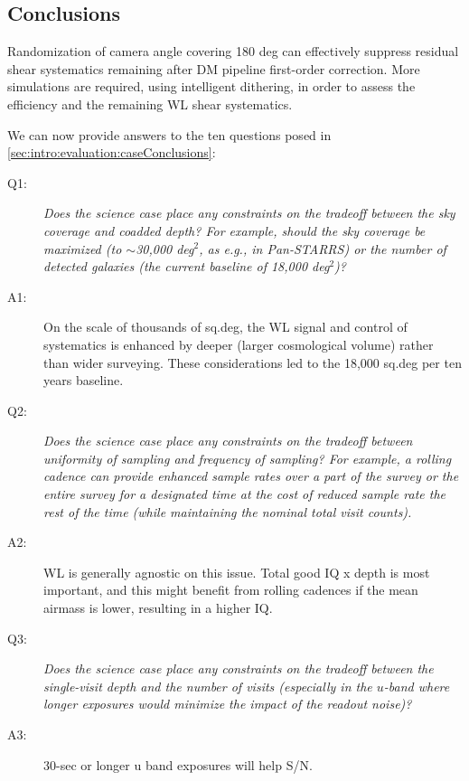 \subsection{Conclusions}

Randomization of camera angle covering 180 deg can effectively suppress
residual shear systematics remaining after DM pipeline first-order
correction.   More simulations are required, using intelligent
dithering, in order to assess the efficiency and the remaining WL shear
systematics.


We can now provide answers to the ten questions posed in %
\autoref{sec:intro:evaluation:caseConclusions}:

\begin{description}

\item[Q1:] {\it Does the science case place any constraints on the
tradeoff between the sky coverage and coadded depth? For example, should
the sky coverage be maximized (to $\sim$30,000 deg$^2$, as e.g., in
Pan-STARRS) or the number of detected galaxies (the current baseline
of 18,000 deg$^2$)?}

\item[A1:] On the scale of thousands of sq.deg, the WL signal and
control of systematics is enhanced by deeper (larger cosmological
volume) rather than wider surveying. These considerations led to the
18,000 sq.deg per ten years baseline.

\item[Q2:] {\it Does the science case place any constraints on the
tradeoff between uniformity of sampling and frequency of  sampling? For
example, a rolling cadence can provide enhanced sample rates over a part
of the survey or the entire survey for a designated time at the cost of
reduced sample rate the rest of the time (while maintaining the nominal
total visit counts).}

\item[A2:] WL is generally agnostic on this issue. Total good IQ x depth
is most important, and this might benefit from rolling cadences if the
mean airmass is lower, resulting in a higher IQ.


\item[Q3:] {\it Does the science case place any constraints on the
tradeoff between the single-visit depth and the number of visits
(especially in the $u$-band where longer exposures would minimize the
impact of the readout noise)?}

\item[A3:] 30-sec or longer u band exposures will help S/N.


\end{description}
